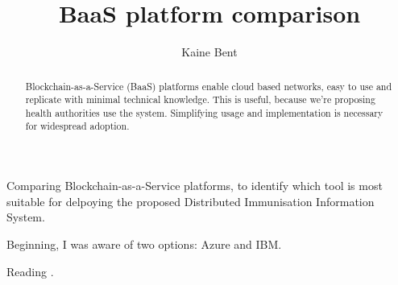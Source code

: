 \documentclass{article}
\title{BaaS platform comparison}
\author{Kaine Bent}
\begin{document}
\begin{titlepage}
\maketitle
\end{titlepage}

\begin{abstract}
Blockchain-as-a-Service (BaaS) platforms enable cloud based networks, easy to use and replicate with minimal technical knowledge.
This is useful, because we're proposing health authorities use the system. Simplifying usage and implementation is necessary for widespread adoption.
\end{abstract}

\begin{flushleft}
Comparing Blockchain-as-a-Service platforms, to identify which tool is most suitable for delpoying the proposed Distributed Immunisation Information System.

Beginning, I was aware of two options: Azure and IBM.

Reading \cite{onik_performance_2019}.

\end{flushleft}

\printbibliography
\end{document}
